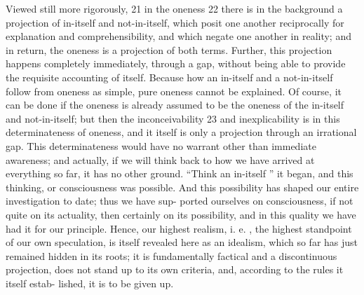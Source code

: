 Viewed still more rigorously, 21 in the oneness 22 there is in the background a
projection of in-itself and not-in-itself, which posit one another reciprocally
for explanation and comprehensibility, and which negate one another in
reality; and in return, the oneness is a projection of both terms.
Further, this
projection happens completely immediately, through a gap, without being
able to provide the requisite accounting of itself.
Because how an in-itself
and a not-in-itself follow from oneness as simple, pure oneness cannot be
explained.
Of course, it can be done if the oneness is already assumed to be
the oneness of the in-itself and not-in-itself; but then the inconceivability 23
and inexplicability is in this determinateness of oneness, and it itself is only a
projection through an irrational gap.
This determinateness would have no
warrant other than immediate awareness; and actually, if we will think back
to how we have arrived at everything so far, it has no other ground.
“Think
an in-itself ” it began, and this thinking, or consciousness was possible.
And
this possibility has shaped our entire investigation to date; thus we have sup-
ported ourselves on consciousness, if not quite on its actuality, then certainly
on its possibility, and in this quality we have had it for our principle.
Hence,
our highest realism, i.
e.
, the highest standpoint of our own speculation, is
itself revealed here as an idealism, which so far has just remained hidden in
its roots; it is fundamentally factical and a discontinuous projection, does
not stand up to its own criteria, and, according to the rules it itself estab-
lished, it is to be given up.

